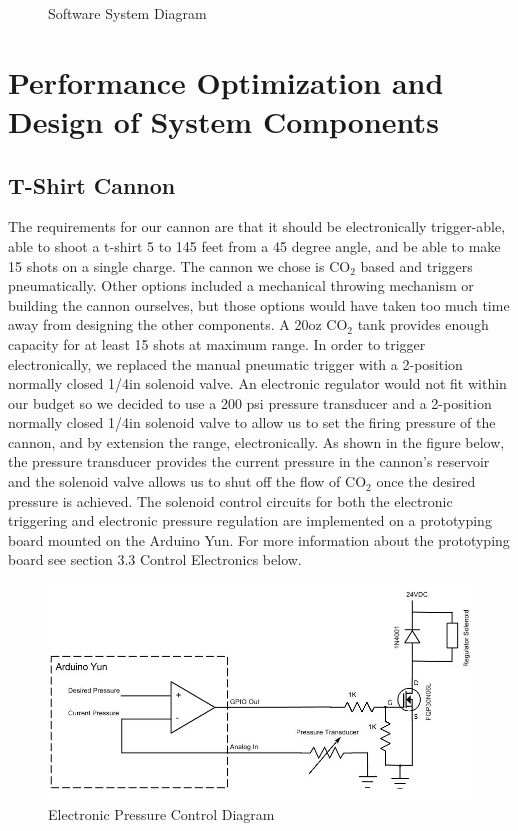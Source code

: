 \documentclass[letterpaper,12pt]{article}
\begin{document}
\begin{figure}[h!]
  \centering
  
  \caption{Software System Diagram}
  \label{fig:system_diagram}
\end{figure}


\section{Performance Optimization and Design of System Components}
\label{sec:optimization}

\subsection{T-Shirt Cannon}
The requirements for our cannon are that it should be electronically
trigger-able, able to shoot a t-shirt 5 to 145 feet from a 45 degree angle, and
be able to make 15 shots on a single charge. The cannon we chose is CO$_2$
based and triggers pneumatically. Other options included a mechanical throwing
mechanism or building the cannon ourselves, but those options would have taken
too much time away from designing the other components. A 20oz CO$_2$ tank
provides enough capacity for at least 15 shots at maximum range. In order to
trigger electronically, we replaced the manual pneumatic trigger with
a 2-position normally closed 1/4in solenoid valve. An electronic regulator
would not fit within our budget so we decided to use a 200 psi pressure
transducer and a 2-position normally closed 1/4in solenoid valve to allow us to
set the firing pressure of the cannon, and by extension the range,
electronically. As shown in the figure below, the pressure transducer provides
the current pressure in the cannon's reservoir and the solenoid valve allows us
to shut off the flow of CO$_2$ once the desired pressure is achieved. The
solenoid control circuits for both the electronic triggering and electronic
pressure regulation are implemented on a prototyping board mounted on the
Arduino Yun. For more information about the prototyping board see section 3.3
Control Electronics below.\\

\begin{figure}[h!]
  \centering
  \includegraphics[width=15cm]{./pics/cannon/PressureControl.jpg}
  \caption{Electronic Pressure Control Diagram}
  \label{fig:pressure_diagram}
\end{figure}
\end{document}
